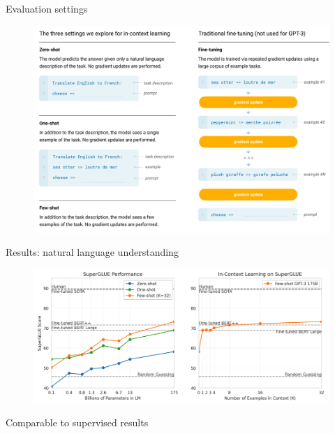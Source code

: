 \documentclass[usenames,dvipsnames,notes,11pt,aspectratio=169,hyperref={colorlinks=true, linkcolor=blue}]{beamer}
\begin{document}
\begin{frame}
    {Evaluation settings}
    \begin{figure}
        \includegraphics[height=0.9\textheight]{figures/gpt3-inf}
    \end{figure}
\end{frame}

\begin{frame}
    {Results: natural language understanding}
    \begin{figure}
        \includegraphics[width=\textwidth]{figures/gpt3-superglue}
    \end{figure}
    Comparable to supervised results
\end{frame}
\end{document}
